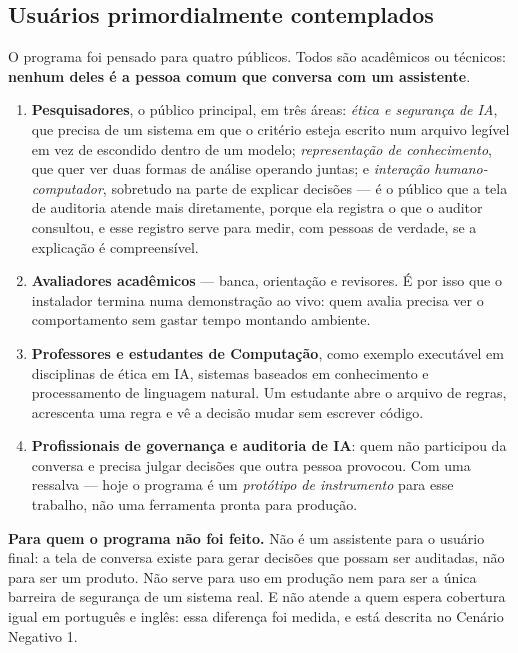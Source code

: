 \documentclass[10pt]{article}
\begin{document}
\subsection{Usuários primordialmente contemplados}

O programa foi pensado para quatro públicos. Todos são acadêmicos ou técnicos: \textbf{nenhum deles é a pessoa comum que conversa com um assistente}.

\begin{enumerate}\itemsep1pt
\item \textbf{Pesquisadores}, o público principal, em três áreas: \emph{ética e segurança de IA}, que precisa de um sistema em que o critério esteja escrito num arquivo legível em vez de escondido dentro de um modelo; \emph{representação de conhecimento}, que quer ver duas formas de análise operando juntas; e \emph{interação humano-computador}, sobretudo na parte de explicar decisões --- é o público que a tela de auditoria atende mais diretamente, porque ela registra o que o auditor consultou, e esse registro serve para medir, com pessoas de verdade, se a explicação é compreensível.

\item \textbf{Avaliadores acadêmicos} --- banca, orientação e revisores. É por isso que o instalador termina numa demonstração ao vivo: quem avalia precisa ver o comportamento sem gastar tempo montando ambiente.

\item \textbf{Professores e estudantes de Computação}, como exemplo executável em disciplinas de ética em IA, sistemas baseados em conhecimento e processamento de linguagem natural. Um estudante abre o arquivo de regras, acrescenta uma regra e vê a decisão mudar sem escrever código.

\item \textbf{Profissionais de governança e auditoria de IA}: quem não participou da conversa e precisa julgar decisões que outra pessoa provocou. Com uma ressalva --- hoje o programa é um \emph{protótipo de instrumento} para esse trabalho, não uma ferramenta pronta para produção.
\end{enumerate}

\textbf{Para quem o programa não foi feito.} Não é um assistente para o usuário final: a tela de conversa existe para gerar decisões que possam ser auditadas, não para ser um produto. Não serve para uso em produção nem para ser a única barreira de segurança de um sistema real. E não atende a quem espera cobertura igual em português e inglês: essa diferença foi medida, e está descrita no Cenário Negativo 1.
\end{document}
